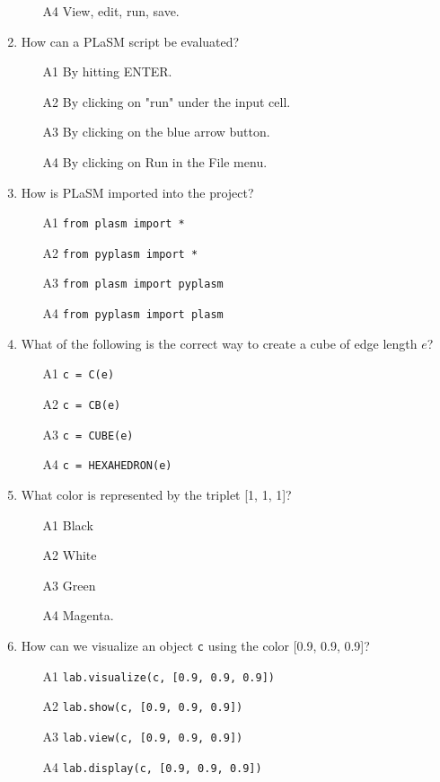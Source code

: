\documentclass{article}
\begin{document}
\begin{enumerate}
\begin{itemize}
\item[A4] View, edit, run, save. 
\end{itemize}
\item How can a PLaSM script be evaluated?
\begin{itemize}
\item[A1] By hitting ENTER.
\item[A2] By clicking on "run" under the input cell.
\item[A3] By clicking on the blue arrow button.
\item[A4] By clicking on Run in the File menu.
\end{itemize}
\item How is PLaSM imported into the project?
\begin{itemize}
\item[A1] {\tt from plasm import *}
\item[A2] {\tt from pyplasm import *}
\item[A3] {\tt from plasm import pyplasm}
\item[A4] {\tt from pyplasm import plasm}
\end{itemize}
\item What of the following is the correct way to create a cube of edge length $e$?
\begin{itemize}
\item[A1] {\tt c = C(e)}
\item[A2] {\tt c = CB(e)}
\item[A3] {\tt c = CUBE(e)}
\item[A4] {\tt c = HEXAHEDRON(e)}
\end{itemize}
\item What color is represented by the triplet [1, 1, 1]?
\begin{itemize}
\item[A1] Black
\item[A2] White
\item[A3] Green
\item[A4] Magenta.
\end{itemize}
\item How can we visualize an object {\tt c} using the color [0.9, 0.9, 0.9]?
\begin{itemize}
\item[A1] {\tt lab.visualize(c, [0.9, 0.9, 0.9])}
\item[A2] {\tt lab.show(c, [0.9, 0.9, 0.9])}
\item[A3] {\tt lab.view(c, [0.9, 0.9, 0.9])}
\item[A4] {\tt lab.display(c, [0.9, 0.9, 0.9])}
\end{itemize}
\end{enumerate}
\end{document}

